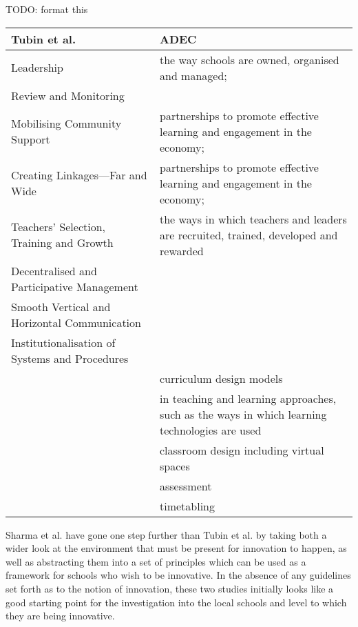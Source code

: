 TODO: format this
\begin{center}
    \begin{tabular}{ | l | p{5cm} |}
    Tubin et al.  & ADEC \\ \hline
    Leadership & the way schools are owned, organised and managed;  \\ \hline
    Review and Monitoring  &  \\ \hline
    Mobilising Community Support &  partnerships to promote effective learning and engagement in the economy; \\ \hline
    Creating Linkages—Far and Wide &  partnerships to promote effective learning and engagement in the economy; \\ \hline
    Teachers’ Selection, Training and Growth & the ways in which teachers and leaders are recruited, trained, developed and rewarded \\ \hline
    Decentralised and Participative Management &  \\ \hline
    Smooth Vertical and Horizontal Communication &  \\ \hline
    Institutionalisation of Systems and Procedures &  \\ \hline
     & curriculum design models \\ \hline
     & in teaching and learning approaches, such as the ways in which learning technologies are used \\ \hline
     & classroom design including virtual spaces \\ \hline
     & assessment \\ \hline
     & timetabling \\ \hline
    \end{tabular} 
\end{center}


Sharma et al. have gone one step further than Tubin et al. by taking both a wider look at the environment that must be present for innovation to happen, as well as abstracting them into a set of principles which can be used as a framework for schools who wish to be innovative. In the absence of any guidelines set forth as to the notion of innovation, these two studies initially looks like a good starting point for the investigation into the local schools and level to which they are being innovative.
\cite{StopI4:online}